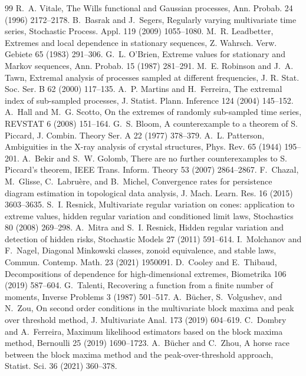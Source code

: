 \documentclass[11pt]{article}
\theoremstyle{definition}
\begin{document}
\begin{thebibliography}{99}
 R.~A. Vitale, The Wills functional and Gaussian processes, Ann. Probab. 24 (1996) 2172--2178.
 B.~Basrak and J.~Segers, Regularly varying multivariate time series, Stochastic Process. Appl. 119 (2009) 1055--1080.
 M.~R. Leadbetter, Extremes and local dependence in stationary sequences, Z. Wahrsch. Verw. Gebiete 65 (1983) 291--306.
 G.~L. O'Brien, Extreme values for stationary and Markov sequences, Ann. Probab. 15 (1987) 281--291.
 M.~E. Robinson and J.~A. Tawn, Extremal analysis of processes sampled at different frequencies, J. R. Stat. Soc. Ser. B 62 (2000) 117--135.
 A.~P. Martins and H.~Ferreira, The extremal index of sub-sampled processes, J. Statist. Plann. Inference 124 (2004) 145--152.
 A.~Hall and M.~G. Scotto, On the extremes of randomly sub-sampled time series, REVSTAT 6 (2008) 151--164.
 G.~S. Bloom, A counterexample to a theorem of S. Piccard, J. Combin. Theory Ser. A 22 (1977) 378--379.
 A.~L. Patterson, Ambiguities in the X-ray analysis of crystal structures, Phys. Rev. 65 (1944) 195--201.
 A.~Bekir and S.~W. Golomb, There are no further counterexamples to S. Piccard's theorem, IEEE Trans. Inform. Theory 53 (2007) 2864--2867.
 F.~Chazal, M.~Glisse, C.~Labru\`ere, and B.~Michel, Convergence rates for persistence diagram estimation in topological data analysis, J. Mach. Learn. Res. 16 (2015) 3603--3635.
 S.~I. Resnick, Multivariate regular variation on cones: application to extreme values, hidden regular variation and conditioned limit laws, Stochastics 80 (2008) 269--298.
 A.~Mitra and S.~I. Resnick, Hidden regular variation and detection of hidden risks, Stochastic Models 27 (2011) 591--614.
 I.~Molchanov and F.~Nagel, Diagonal Minkowski classes, zonoid equivalence, and stable laws, Commun. Contemp. Math. 23 (2021) 1950091.
 D.~Cooley and E.~Thibaud, Decompositions of dependence for high-dimensional extremes, Biometrika 106 (2019) 587--604.
 G.~Talenti, Recovering a function from a finite number of moments, Inverse Problems 3 (1987) 501--517.
 A.~B\"ucher, S.~Volgushev, and N.~Zou, On second order conditions in the multivariate block maxima and peak over threshold method, J. Multivariate Anal. 173 (2019) 604--619.
 C.~Dombry and A.~Ferreira, Maximum likelihood estimators based on the block maxima method, Bernoulli 25 (2019) 1690--1723.
 A.~B\"ucher and C.~Zhou, A horse race between the block maxima method and the peak-over-threshold approach, Statist. Sci. 36 (2021) 360--378.

\end{thebibliography}
\end{document}
